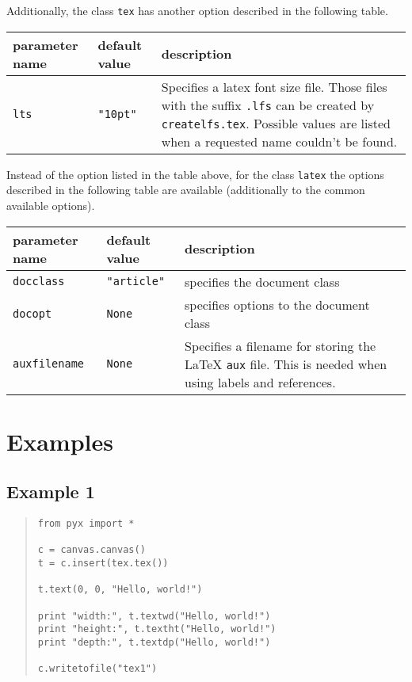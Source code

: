 Additionally, the class \verb|tex| has another option described in
the following table.

\smallskip
\begin{tabularx}{\linewidth}{ll>{\raggedright\arraybackslash}X}
parameter name&default value&description\\
\hline
\texttt{lts}&\texttt{"10pt"}&Specifies a latex font size file. Those
files with the suffix \texttt{.lfs} can be created by
\texttt{createlfs.tex}. Possible values are listed when a requested
name couldn't be found.\\
\end{tabularx}
\smallskip

Instead of the option listed in the table above, for the class
\verb|latex| the options described in the following table are
available (additionally to the common available options).

\smallskip
\begin{tabularx}{\linewidth}{ll>{\raggedright\arraybackslash}X}
parameter name&default value&description\\
\hline
\texttt{docclass}&\texttt{"article"}&specifies the document class\\
\texttt{docopt}&\texttt{None}&specifies options to the document class\\
\texttt{auxfilename}&\texttt{None}&Specifies a filename for storing the \LaTeX{}
\texttt{aux} file. This is needed when using labels and references.\\
\end{tabularx}

\section{Examples}
\subsection{Example 1}
\begin{quote}
\begin{verbatim}
from pyx import *

c = canvas.canvas()
t = c.insert(tex.tex())

t.text(0, 0, "Hello, world!")

print "width:", t.textwd("Hello, world!")
print "height:", t.textht("Hello, world!")
print "depth:", t.textdp("Hello, world!")

c.writetofile("tex1")
\end{verbatim}
\end{quote}

